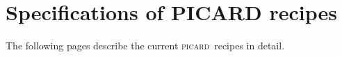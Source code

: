 \documentclass[twoside,11pt,nolof]{starlink}
\providecommand{\picard}{\textsc{picard}}
\begin{document}
\newpage

\section{Specifications of PICARD recipes\label{ap:full}}

The following pages describe the current \picard\ recipes in detail.

\end{document}
